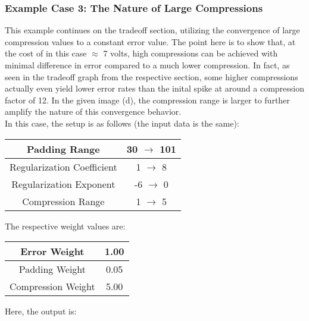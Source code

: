 \documentclass[11pt, a4paper]{article}
\theoremstyle{definition}
\numberwithin{equation}{section}
\begin{document}
\subsubsection{Example Case 3: The Nature of Large Compressions}

This example continues on the tradeoff section, utilizing the convergence of large compression values to a constant error value. The point here is to show that, at the cost of in this case $\approx$ 7 volts, high compressions can be achieved with minimal difference in error compared to a much lower compression. In fact, as seen in the tradeoff graph from the respective section, some higher compressions actually even yield lower error rates than the inital spike at around a compression factor of 12. In the given image (d), the compression range is larger to further amplify the nature of this convergence behavior.
\\
In this case, the setup is as follows (the input data is the same):

\begin{center}
\begin{tabular}{ | c | c | } 
  \hline
   Padding Range & 30 $\rightarrow$ 101 \\ 
  \hline
  Regularization Coefficient & 1 $\rightarrow$ 8 \\ 
  \hline
  Regularization Exponent & -6 $\rightarrow$ 0 \\ 
  \hline
  Compression Range & 1 $\rightarrow$ 5 \\ 
  \hline
\end{tabular}
\end{center}

The respective weight values are:

\begin{center}
\begin{tabular}{ | c | c | } 
  \hline
   Error Weight & 1.00 \\ 
  \hline
  Padding Weight & 0.05 \\ 
  \hline
  Compression Weight & 5.00 \\ 
  \hline
\end{tabular}
\end{center}

Here, the output is:
\end{document}
